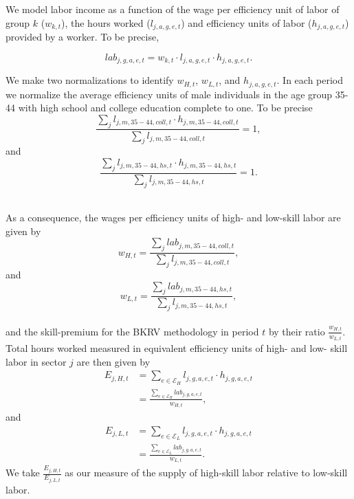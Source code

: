 \documentclass[10pt]{article}
\begin{document}
We model labor income as a function of the wage per efficiency unit of labor of group $k$ ($w_{k,t}$), the hours worked ($l_{j,a,g,e,t}$) and efficiency units of labor ($h_{j,a,g,e,t}$) provided by a worker. To be precise,

\begin{equation*}
lab_{j,g,a,e,t} = w_{ k,t } \cdot l_{j,a,g,e,t} \cdot h_{j,a,g,e,t}.
\end{equation*}

We make two normalizations to identify $w_{H,t}$, $w_{L,t}$, and $h_{j,a,g,e,t}$. In each period we normalize the average efficiency units of male individuals in the age group 35-44 with high school and college education complete to one. To be precise
\begin{equation*}
    \frac{ \sum_{j} l_{j,m,35-44,coll,t} \cdot h_{j,m,35-44,coll,t} }{ \sum_{j} l_{j,m,35-44,coll,t} } = 1,
\end{equation*}
and 
\begin{equation*}
    \frac{ \sum_{j} l_{j,m,35-44,hs,t} \cdot h_{j,m,35-44,hs,t} }{ \sum_{j} l_{j,m,35-44,hs,t} } = 1 .
\end{equation*}\\

\medskip

As a consequence, the wages per efficiency units of high- and low-skill labor are given by
\begin{equation*}
    w_{H,t} = \frac{ \sum_{j} lab_{j,m,35-44,coll,t} }{ \sum_{j} l_{j,m,35-44,coll,t} } ,
\end{equation*}
and
\begin{equation*}
    w_{L,t} = \frac{ \sum_{j} lab_{j,m,35-44,hs,t} }{ \sum_{j} l_{j,m,35-44,hs,t} }, 
\end{equation*}\\
and the skill-premium for the BKRV methodology in period $t$ by their ratio $\frac{w_{H,t}}{w_{L,t}}$.\\

Total hours worked measured in equivalent efficiency units of high- and low- skill labor in sector $j$ are then given by
\begin{align*}
    E_{j,H,t} & = \sum\limits_{ e \in \mathcal{E} _{H} } l_{j,g,a,e,t} \cdot h_{j,g,a,e,t} \\
               & = \frac{ \sum\limits_{ e \in \mathcal{E} _{H} } lab_{j,g,a,e,t} }{ w_{H,t} }, 
\end{align*}
and
\begin{align*}
    E_{j,L,t} & = \sum\limits_{ e \in \mathcal{E} _{L} } l_{j,g,a,e,t} \cdot h_{j,g,a,e,t} \\
               & = \frac{ \sum\limits_{ e \in \mathcal{E} _{L} }  lab_{j,g,a,e,t} }{ w_{L,t} } . 
\end{align*}
We take $\frac{E_{j,H,t}}{E_{j,L,t}}$ as our measure of the supply of high-skill labor relative to low-skill labor.\\
\end{document}
